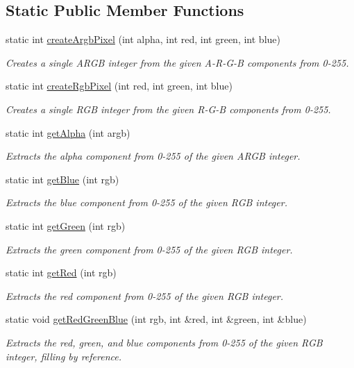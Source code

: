\subsection*{Static Public Member Functions}
\begin{DoxyCompactItemize}
\item 
static int \mbox{\hyperlink{classGCanvas_a5ef799a28166a7f009365102168a2d06}{create\+Argb\+Pixel}} (int alpha, int red, int green, int blue)
\begin{DoxyCompactList}\small\item\em Creates a single A\+R\+GB integer from the given A-\/\+R-\/\+G-\/B components from 0-\/255. \end{DoxyCompactList}\item 
static int \mbox{\hyperlink{classGCanvas_a10beefcf8631433d0cdddefd4e24c76a}{create\+Rgb\+Pixel}} (int red, int green, int blue)
\begin{DoxyCompactList}\small\item\em Creates a single R\+GB integer from the given R-\/\+G-\/B components from 0-\/255. \end{DoxyCompactList}\item 
static int \mbox{\hyperlink{classGCanvas_a48d898ddf58651669b5f33240a65096f}{get\+Alpha}} (int argb)
\begin{DoxyCompactList}\small\item\em Extracts the alpha component from 0-\/255 of the given A\+R\+GB integer. \end{DoxyCompactList}\item 
static int \mbox{\hyperlink{classGCanvas_a9406c01e6961257db37b5dc95945f914}{get\+Blue}} (int rgb)
\begin{DoxyCompactList}\small\item\em Extracts the blue component from 0-\/255 of the given R\+GB integer. \end{DoxyCompactList}\item 
static int \mbox{\hyperlink{classGCanvas_ac307c120ba81c4531d46924ba3358382}{get\+Green}} (int rgb)
\begin{DoxyCompactList}\small\item\em Extracts the green component from 0-\/255 of the given R\+GB integer. \end{DoxyCompactList}\item 
static int \mbox{\hyperlink{classGCanvas_adef2eb72dada1f3c3ef5079705cd278a}{get\+Red}} (int rgb)
\begin{DoxyCompactList}\small\item\em Extracts the red component from 0-\/255 of the given R\+GB integer. \end{DoxyCompactList}\item 
static void \mbox{\hyperlink{classGCanvas_ab13dd3d16d2b7bd90fbf9595df9cf2b7}{get\+Red\+Green\+Blue}} (int rgb, int \&red, int \&green, int \&blue)
\begin{DoxyCompactList}\small\item\em Extracts the red, green, and blue components from 0-\/255 of the given R\+GB integer, filling by reference. \end{DoxyCompactList}\end{DoxyCompactItemize}
